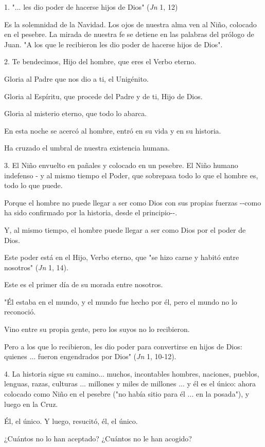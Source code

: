 1. "... les dio poder de hacerse hijos de Dios" (\emph{Jn} 1, 12)

Es la solemnidad de la Navidad. Los ojos de nuestra alma ven al Niño,
colocado en el pesebre. La mirada de nuestra fe se detiene en las
palabras del prólogo de Juan. "A los que le recibieron les dio poder de
hacerse hijos de Dios".

2. Te bendecimos, Hijo del hombre, que eres el Verbo eterno.

Gloria al Padre que nos dio a ti, el Unigénito.

Gloria al Espíritu, que procede del Padre y de ti, Hijo de Dios.

Gloria al misterio eterno, que todo lo abarca.

En esta noche se acercó al hombre, entró en su vida y en su historia.

Ha cruzado el umbral de nuestra existencia humana.

3. El Niño envuelto en pañales y colocado en un pesebre. El Niño humano
indefenso - y al mismo tiempo el Poder, que sobrepasa todo lo que el
hombre es, todo lo que puede.

Porque el hombre no puede llegar a ser como Dios con sus propias fuerzas
-\/-como ha sido confirmado por la historia, desde el principio-\/-.

Y, al mismo tiempo, el hombre puede llegar a ser como Dios por el poder
de Dios.

Este poder está en el Hijo, Verbo eterno, que "se hizo carne y habitó
entre nosotros" (\emph{Jn} 1, 14).

Este es el primer día de su morada entre nosotros.

"Él estaba en el mundo, y el mundo fue hecho por él, pero el mundo no lo
reconoció.

Vino entre su propia gente, pero los suyos no lo recibieron.

Pero a los que lo recibieron, les dio poder para convertirse en hijos de
Dios: quienes ... fueron engendrados por Dios" (\emph{Jn} 1, 10-12).

4. La historia sigue su camino... muchos, incontables hombres, naciones,
pueblos, lenguas, razas, culturas ... millones y miles de millones ... y
él es el único: ahora colocado como Niño en el pesebre ("no había sitio
para él ... en la posada"), y luego en la Cruz.

Él, el único. Y luego, resucitó, él, el único.

¿Cuántos no lo han aceptado? ¿Cuántos no le han acogido?

